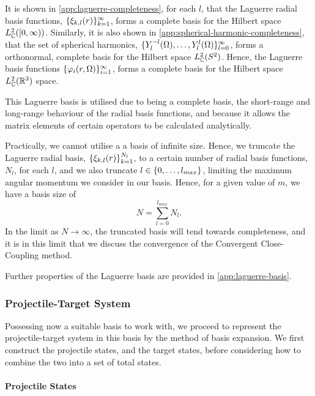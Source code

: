 \documentclass[draft]{article}
\begin{document}
It is shown in \autoref{app:laguerre-completeness}, for each $l$, that the
Laguerre radial basis functions, $\lbrace\xi_{k, l}(r)\rbrace_{k = 1}^{\infty}$,
forms a complete basis for the Hilbert space $L_{\mathbb{C}}^{2}([0, \infty))$.
Similarly, it is also shown in \autoref{app:spherical-harmonic-completeness},
that the set of spherical harmonics,
$\lbrace Y_{l}^{-l}(\Omega), \dotsc, Y_{l}^{l}(\Omega)\rbrace_{l = 0}^{\infty}$,
forms a orthonormal, complete basis for the Hilbert space
$L_{\mathbb{C}}^{2}(S^{2})$.
Hence, the Laguerre basis functions
$\lbrace\varphi_{i}(r, \Omega)\rbrace_{i = 1}^{\infty}$, forms a complete basis
for the Hilbert space $L_{\mathbb{C}}^{2}(\mathbb{R}^{3})$ space.

This Laguerre basis is utilised due to being a complete basis, the short-range
and long-range behaviour of the radial basis functions, and because it allows
the matrix elements of certain operators to be calculated analytically.

Practically, we cannot utilise a a basis of infinite size.
Hence, we truncate the Laguerre radial basis,
$\lbrace\xi_{k, l}(r)\rbrace_{k = 1}^{N_{l}}$, to a certain number of radial basis
functions, $N_{l}$, for each $l$, and we also truncate
$l \in \lbrace0, \dotsc, l_{max}\rbrace$,
limiting the maximum angular momentum we consider in our basis.
Hence, for a given value of $m$, we have a basis size of
\begin{equation}
  \label{eq:basis-size}
  N
  =
  \sum_{l = 0}^{l_{max}}
  N_{l}
  .
\end{equation}
In the limit as $N \to \infty$, the truncated basis will tend towards
completeness, and it is in this limit that we discuss the convergence of the
Convergent Close-Coupling method.

Further properties of the Laguerre basis are provided in
\autoref{app:laguerre-basis}.

\subsubsection{Projectile-Target System}
\label{sec:projectile-target}

Possessing now a suitable basis to work with, we proceed to represent the
projectile-target system in this basis by the method of basis expansion.
We first construct the projectile states, and the target states, before
considering how to combine the two into a set of total states.

\paragraph{Projectile States}
\end{document}
